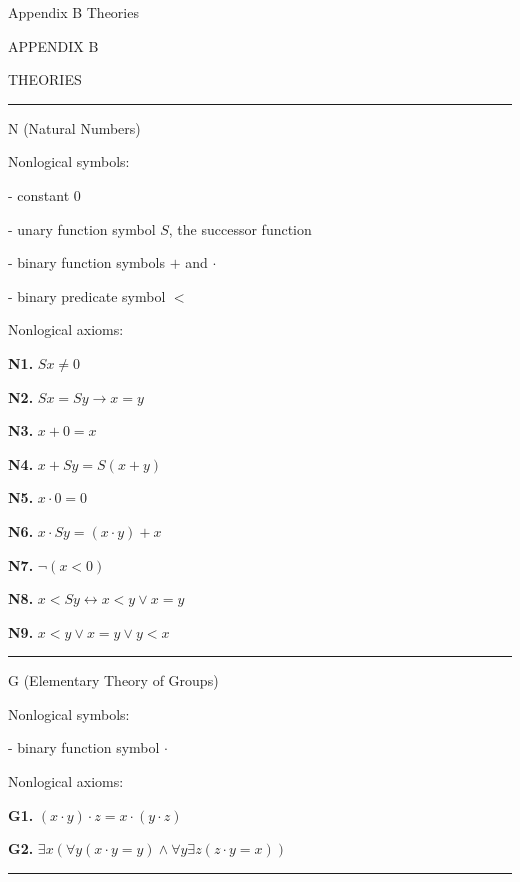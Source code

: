  {Appendix B Theories}
\centerline{\xmplbxi APPENDIX B}
\medskip
\centerline{\xmplbx THEORIES}
\bigskip

\hrule
\beginsection N (Natural Numbers)

Nonlogical symbols:
\item{-} constant $0$
\item{-} unary function symbol $S$, the successor function
\item{-} binary function symbols $+$ and $\cdot$
\item{-} binary predicate symbol $<$
\smallskip

\noindent Nonlogical axioms:
\item{} {\bf N1.} $Sx \ne 0$
\item{} {\bf N2.} $Sx = Sy \to x = y$
\item{} {\bf N3.} $x + 0 = x$
\item{} {\bf N4.} $x + Sy = S(x + y)$
\item{} {\bf N5.} $x \cdot 0 = 0$
\item{} {\bf N6.} $x \cdot Sy = (x \cdot y) + x$
\item{} {\bf N7.} $\neg (x < 0)$
\item{} {\bf N8.} $x < Sy \leftrightarrow x < y \lor x = y$
\item{} {\bf N9.} $x < y \lor x = y \lor y < x$
\smallskip
\hrule

\beginsection G (Elementary Theory of Groups)

Nonlogical symbols:
\item{-} binary function symbol $\cdot$
\smallskip

\noindent Nonlogical axioms:
\item{} {\bf G1.} $(x \cdot y) \cdot z = x \cdot (y \cdot z)$
\item{} {\bf G2.} $\exists x(\forall y(x \cdot y = y) \land \forall y \exists z(z \cdot y = x))$
\smallskip
\hrule

\vfill
\break
